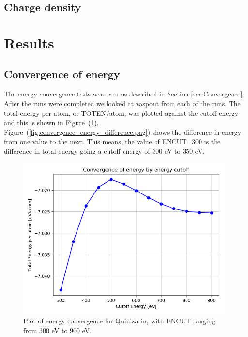 \documentclass{article}
\begin{document}
  \subsection{Charge density}



\vspace{1cm}

\section{Results}   \label{sec:Results}

  \subsection{Convergence of energy}

     The energy convergence tests were run as described in Section \ref{sec:Convergence}. After the runs were completed we looked at vaspout from each of the runs. The total energy per atom, or TOTEN/atom, was plotted against the cutoff energy and this is shown in Figure~(\ref{fig:convergence_energy.png}). \\

     Figure~(\ref{fig:convergence_energy_difference.png}) shows the difference in energy from one value to the next. This means, the value of ENCUT=300 is the difference in total energy going a cutoff energy of 300 eV to 350 eV. \\

    \iffalse
    \begin{figure}[H]
      \centering
      \includegraphics[width = 11cm]{../fig/convergence_energy.png}
      \caption{Plot of energy convergence for Quinizarin, with ENCUT ranging from 300 eV to 900 eV. }
      \label{fig:convergence_energy.png}
    \end{figure}
\end{document}
